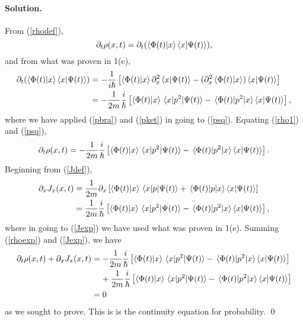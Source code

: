\documentclass[10pt]{article}
\newcommand{\refeq}[1]{(\ref{#1})}
\newenvironment{solution}
{
    \paragraph{Solution.}
    \ignorespaces
}
{
    \bigskip
}
\begin{document}
\begin{solution}
	From \refeq{rhodef},
	\begin{equation} \label{rho1}
		\partial_t \rho(x, t) = \partial_t (\braket{\Phi(t)}{x} \braket{x}{\Psi(t)}),
	\end{equation}
	and from what was proven in 1(c),
	\begin{align} 
		\partial_t ( \braket{\Phi(t)}{x} \braket{x}{\Psi(t)}) &= -\frac{1}{i \hbar} \left[ \braket{\Phi(t)}{x} \partial_x^2 \braket{x}{\Psi(t)} - (\partial_x^2 \braket{\Phi(t)}{x}) \braket{x}{\Psi(t)} \right] \\
		&= -\frac{1}{2m} \frac{i}{\hbar} \left[ \braket{\Phi(t)}{x} \mel{x}{p^2}{\Psi(t)} - \mel{\Phi(t)}{p^2}{x} \braket{x}{\Psi(t)} \right], \label{psq}
	\end{align}
	where we have applied \refeq{pbra} and \refeq{pket} in going to \refeq{psq}.  Equating \refeq{rho1} and \refeq{psq},
	\begin{equation} \label{rhoexp}
		\partial_t \rho(x, t) = -\frac{1}{2m} \frac{i}{\hbar} \left[ \braket{\Phi(t)}{x} \mel{x}{p^2}{\Psi(t)} - \mel{\Phi(t)}{p^2}{x} \braket{x}{\Psi(t)} \right].
	\end{equation}
	Beginning from \refeq{Jdef},
	\begin{align}
		\partial_x J_x(x, t) &= \frac{1}{2m} \partial_x \left[ \braket{\Phi(t)}{x} \mel{x}{p}{\Psi(t)} + \mel{\Phi(t)}{p}{x} \braket{x}{\Psi(t)} \right] \\
		&= \frac{1}{2m} \frac{i}{\hbar} \left[ \braket{\Phi(t)}{x} \mel{x}{p^2}{\Psi(t)} - \mel{\Phi(t)}{p^2}{x} \braket{x}{\Psi(t)} \right] \label{Jexp},
	\end{align}
	where in going to \refeq{Jexp} we have used what was proven in 1(e).  Summing \refeq{rhoexp} and \refeq{Jexp}, we have
	\begin{align}
		\partial_t \rho(x, t) + \partial_x J_x(x, t) &= -\frac{1}{2m} \frac{i}{\hbar} \left[ \braket{\Phi(t)}{x} \mel{x}{p^2}{\Psi(t)} - \mel{\Phi(t)}{p^2}{x} \braket{x}{\Psi(t)} \right] \notag \\
		&\phantom{=\ } + \frac{1}{2m} \frac{i}{\hbar} \left[ \braket{\Phi(t)}{x} \mel{x}{p^2}{\Psi(t)} - \mel{\Phi(t)}{p^2}{x} \braket{x}{\Psi(t)} \right] \\
		&= 0
	\end{align}
	as we sought to prove.  This is is the continuity equation for probability. \qed
\end{solution}

\newcommand{\Le}{L_3}
\newcommand{\Lz}{L_z}
\newcommand{\Py}{P_y}
\newcommand{\Px}{P_x}

\newcommand{\lei}{l_{3,i}}
\newcommand{\klei}{\ket{\lei}}

\newcommand{\Ud}{U^\dagger}
\newcommand{\Uii}{U_{ii}}

\newcommand{\Xpm}{X_\pm}
\newcommand{\Xp}{X_+}
\newcommand{\Xm}{X_-}
\newcommand{\Ypm}{Y_\pm}
\end{document}
